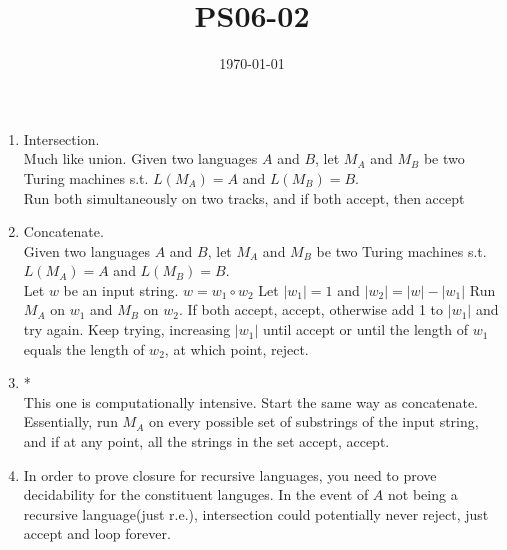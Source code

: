 \documentclass{article}
\title{PS06-02}
\date{\today}
\begin{document}
\maketitle
\begin{enumerate}[label=\alph*]
\item Intersection.\\
Much like union. Given two languages $A$ and $B$, let $M_A$ and $M_B$ be two Turing machines s.t. $L(M_A) = A$ and $L(M_B) = B$.\\
Run both simultaneously on two tracks, and if both accept, then accept
\item Concatenate.\\
Given two languages $A$ and $B$, let $M_A$ and $M_B$ be two Turing machines s.t. $L(M_A) = A$ and $L(M_B) = B$.\\
Let $w$ be an input string. $w = w_1\circ w_2$
Let $\lvert w_1 \rvert = 1$ and $\lvert w_2 \rvert = \lvert w \rvert - \lvert w_1 \rvert$
Run $M_A$ on $w_1$ and $M_B$ on $w_2$. If both accept, accept, otherwise add 1 to $\lvert w_1 \rvert$ and try again. Keep trying, increasing $\lvert w_1 \rvert$ until accept or until the length of $w_1$ equals the length of $w_2$, at which point, reject.
\item *\\
This one is computationally intensive. Start the same way as concatenate. Essentially, run $M_A$ on every possible set of substrings of the input string, and if at any point, all the strings in the set accept, accept.
\item In order to prove closure for recursive languages, you need to prove decidability for the constituent languges. In the event of $A$ not being a recursive language(just r.e.), intersection could potentially never reject, just accept and loop forever. 
\end{enumerate}
\end{document}

